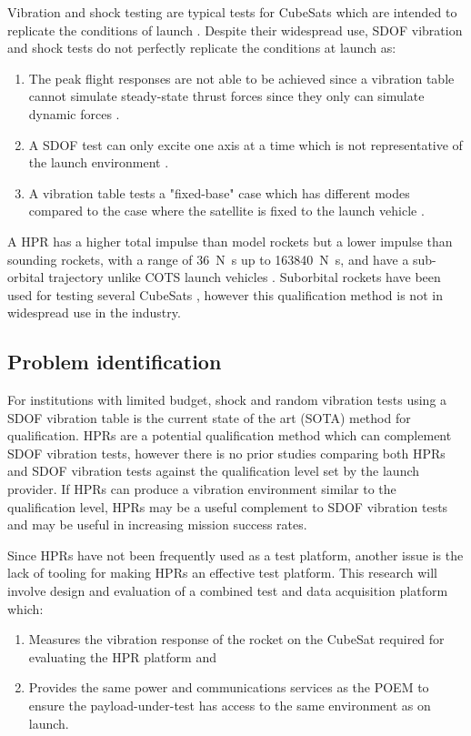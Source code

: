 \documentclass[a4paper,11pt]{article}
\begin{document}
Vibration and shock testing are typical tests for CubeSats which are intended to replicate the conditions of launch \cite{welle2020overview}. Despite their widespread use, SDOF vibration and shock tests do not perfectly replicate the conditions at launch as\cite{gordon2015benefits,nath2022study}:
\begin{enumerate}
  \item The peak flight responses are not able to be achieved since a vibration table cannot simulate steady-state thrust forces since they only can simulate dynamic forces \cite{gordon2015benefits}.
  \item A SDOF test can only excite one axis at a time which is not representative of the launch environment \cite{gordon2015benefits,nath2022study}.
  \item A vibration table tests a "fixed-base" case which has different modes compared to the case where the satellite is fixed to the launch vehicle \cite{gordon2015benefits}.
\end{enumerate}

A HPR has a higher total impulse than model rockets but a lower impulse than sounding rockets, with a range of \SI{36}{\newton\second} up to \SI{163840}{\newton\second}, and have a sub-orbital trajectory unlike COTS launch vehicles \cite{pierce2019development}. Suborbital rockets have been used for testing several CubeSats \cite{9316404,minelli2019mobile}, however this qualification method is not in widespread use in the industry.

\subsection{Problem identification}
For institutions with limited budget, shock and random vibration tests using a SDOF vibration table is the current state of the art (SOTA) method for qualification. HPRs are a potential qualification method which can complement SDOF vibration tests, however there is no prior studies comparing both HPRs and SDOF vibration tests against the qualification level set by the launch provider. If HPRs can produce a vibration environment similar to the qualification level, HPRs may be a useful complement to SDOF vibration tests and may be useful in increasing mission success rates.

Since HPRs have not been frequently used as a test platform, another issue is the lack of tooling for making HPRs an effective test platform. This research will involve design and evaluation of a combined test and data acquisition platform which:
\begin{enumerate}
  \item Measures the vibration response of the rocket on the CubeSat required for evaluating the HPR platform and
  \item Provides the same power and communications services as the POEM to ensure the payload-under-test has access to the same environment as on launch.
\end{enumerate}
\end{document}

